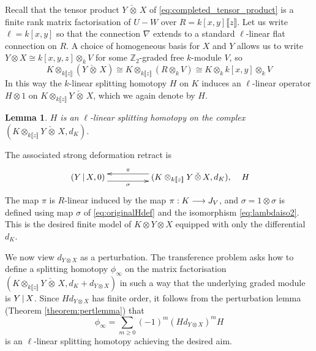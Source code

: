 \documentclass[english,letter paper,12pt,leqno]{article}
\newtheorem{lemma}[theorem]{Lemma}
\theoremstyle{example}
\numberwithin{equation}{section}
\begin{document}
Recall that the tensor product $Y \,\check{\otimes}\, X$ of \eqref{eq:completed_tensor_product} is a finite rank matrix factorisation of $U - W$ over $R = k[x,y]\llbracket z \rrbracket$. Let us write $\ell = k[x,y]$ so that the connection $\nabla$ extends to a standard $\ell$-linear flat connection on $R$. A choice of homogeneous basis for $X$ and $Y$ allows us to write $Y \otimes X \cong k[x,y,z] \otimes_k V$ for some $\mathbb{Z}_2$-graded free $k$-module $V$, so
\begin{equation}\label{eq:lambdaiso2}
K \otimes_{k\llbracket z \rrbracket}( Y \,\check{\otimes}\, X ) \cong K \otimes_{k\llbracket z \rrbracket} (R \otimes_k V) \cong K \otimes_k k[x,y] \otimes_k V
\end{equation}
In this way the $k$-linear splitting homotopy $H$ on $K$ induces an $\ell$-linear operator $H \otimes 1$ on $K \otimes_{k\llbracket z \rrbracket} Y \,\check{\otimes}\, X$, which we again denote by $H$.

\begin{lemma} $H$ is an $\ell$-linear splitting homotopy on the complex $(K \otimes_{k\llbracket z \rrbracket} Y \,\check{\otimes}\, X, d_K)$.
\end{lemma}

The associated strong deformation retract is
\[
\xymatrix@C+2pc{
(Y \l X,0) \ar@<-1ex>[r]_-{\sigma} & (K \otimes_{k\llbracket z \rrbracket} Y \,\check{\otimes}\, X, d_K), \ar@<-1ex>[l]_-{\pi}
} \quad H
\]
The map $\pi$ is $R$-linear induced by the map $\pi: K \longrightarrow J_V$, and $\sigma = 1 \otimes \sigma$ is defined using map $\sigma$ of \eqref{eq:originalHdef} and the isomorphism \eqref{eq:lambdaiso2}. This is the desired finite model of $K \otimes Y \otimes X$ equipped with only the differential $d_K$. 

We now view $d_{Y \otimes X}$ as a perturbation. The transference problem asks how to define a splitting homotopy $\phi_\infty$ on the matrix factorisation $(K \otimes_{k\llbracket z \rrbracket} Y \,\check{\otimes}\, X , d_K + d_{Y \otimes X})$ in such a way that the underlying graded module is $Y \,|\, X$. Since $H d_{Y \otimes X}$ has finite order, it follows from the perturbation lemma (Theorem \ref{theorem:pertlemma}) that
\[
\phi_\infty = \sum_{m \ge 0} (-1)^m (H d_{Y \otimes X})^m H
\]
is an $\ell$-linear splitting homotopy achieving the desired aim.
\end{document}
